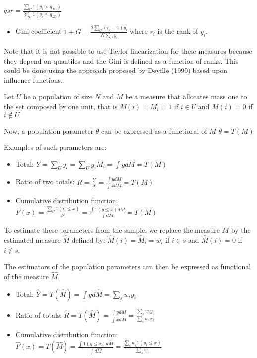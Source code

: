 \documentclass[]{book}
\providecommand{\tightlist}{%
  \setlength{\itemsep}{0pt}\setlength{\parskip}{0pt}}
\begin{document}
\(qsr=\frac{\sum_U 1(y_i>q_{.80})}{\sum_U 1(y_i\leq q_{.20})}\)

\begin{itemize}
\tightlist
\item
  Gini coefficient \(1+G=\frac{2\sum_U (r_i-1)y_i}{N\sum_Uy_i}\) where
  \(r_i\) is the rank of \(y_i\).
\end{itemize}

Note that it is not possible to use Taylor linearization for these
measures because they depend on quantiles and the Gini is defined as a
function of ranks. This could be done using the approach proposed by
Deville (1999) based upon influence functions.

Let \(U\) be a population of size \(N\) and \(M\) be a measure that
allocates mass one to the set composed by one unit, that is
\(M(i)=M_i= 1\) if \(i\in U\) and \(M(i)=0\) if \(i\notin U\)

Now, a population parameter \(\theta\) can be expressed as a functional
of \(M\) \(\theta=T(M)\)

Examples of such parameters are:

\begin{itemize}
\item
  Total: \(Y=\sum_Uy_i=\sum_U y_iM_i=\int ydM=T(M)\)
\item
  Ratio of two totals:
  \(R=\frac{Y}{X}=\frac{\int y dM}{\int x dM}=T(M)\)
\item
  Cumulative distribution function:
  \(F(x)=\frac{\sum_U 1(y_i\leq x)}{N}=\frac{\int 1(y\leq x)dM}{\int{dM}}=T(M)\)
\end{itemize}

To estimate these parameters from the sample, we replace the measure
\(M\) by the estimated measure \(\hat{M}\) defined by:
\(\hat{M}(i)=\hat{M}_i= w_i\) if \(i\in s\) and \(\hat{M}(i)=0\) if
\(i\notin s\).

The estimators of the population parameters can then be expressed as
functional of the measure \(\hat{M}\).

\begin{itemize}
\item
  Total: \(\hat{Y}=T(\hat{M})=\int yd\hat{M}=\sum_s w_iy_i\)
\item
  Ratio of totals:
  \(\hat{R}=T(\hat{M})=\frac{\int y d\hat{M}}{\int x d\hat{M}}=\frac{\sum_s w_iy_i}{\sum_s w_ix_i}\)
\item
  Cumulative distribution function:
  \(\hat{F}(x)=T(\hat{M})=\frac{\int 1(y\leq x)d\hat{M}}{\int{d\hat{M}}}=\frac{\sum_s w_i 1(y_i\leq x)}{\sum_s w_i}\)
\end{itemize}
\end{document}
